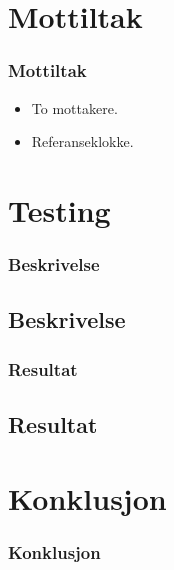 \documentclass[xcolor=table]{beamer}
\begin{document}
\section{Mottiltak}
\begin{frame}
\frametitle{Mottiltak}
  \begin{itemize}
    \item To mottakere.
    \item Referanseklokke.
  \end{itemize}
\end{frame}

\section{Testing}
\begin{frame}
\frametitle{Beskrivelse}
  \subsection{Beskrivelse}
\end{frame}

\begin{frame}
\frametitle{Resultat}
  \subsection{Resultat}
\end{frame}

\section{Konklusjon}
\begin{frame}
  \frametitle{Konklusjon}
\end{frame}
\end{document}
